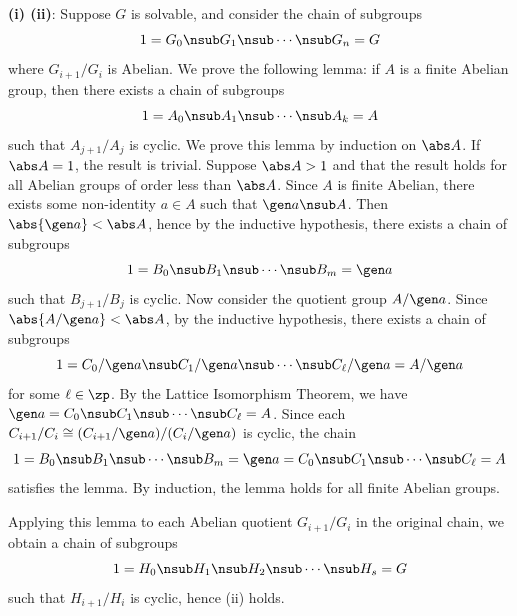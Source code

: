 \begin{sol}
    \textbf{(i) \rightimp (ii)}: Suppose $G$ is solvable, and consider the chain of subgroups
    \[
    	1 = G_0 \nsub G_1 \nsub \cdots \nsub G_n = G
    \]
    where $G_{i + 1}/G_i$ is Abelian.
	We prove the following lemma: if $A$ is a finite Abelian group, then there exists a chain of subgroups
    \[
    	1 = A_0 \nsub A_1 \nsub \cdots \nsub A_k = A
    \]
    such that $A_{j + 1}/A_j$ is cyclic.
	We prove this lemma by induction on $\abs A$.
	If $\abs A = 1$, the result is trivial.
	Suppose $\abs A > 1$ and that the result holds for all Abelian groups of order less than $\abs A$.
	Since $A$ is finite Abelian, there exists some non-identity $a \in A$ such that $\gen a \nsub A$.
	Then $\abs{\gen a} < \abs A$, hence by the inductive hypothesis, there exists a chain of subgroups
    \[
    	1 = B_0 \nsub B_1 \nsub \cdots \nsub B_m = \gen a
    \]
    such that $B_{j + 1}/B_j$ is cyclic.
	Now consider the quotient group $A/\gen a$.
	Since $\abs{A/\gen a} < \abs A$, by the inductive hypothesis, there exists a chain of subgroups
    \[
    	1 = C_0/\gen a \nsub C_1/\gen a \nsub \cdots \nsub C_\ell/\gen a = A/\gen a
    \]
    for some $\ell \in \zp$.
	By the Lattice Isomorphism Theorem, we have $\gen a = C_0 \nsub C_1 \nsub \cdots \nsub C_\ell = A$.
	Since each $C_{i + 1}/C_i \cong (C_{i + 1}/\gen a)/(C_i/\gen a)$ is cyclic, the chain
    \[
    	1 = B_0 \nsub B_1 \nsub \cdots \nsub B_m = \gen a = C_0 \nsub C_1 \nsub \cdots \nsub C_\ell = A
    \]
    satisfies the lemma.
	By induction, the lemma holds for all finite Abelian groups. 

    Applying this lemma to each Abelian quotient $G_{i + 1}/G_i$ in the original chain, we obtain a chain of subgroups
    \[
    	1 = H_0 \nsub H_1 \nsub H_2 \nsub \cdots \nsub H_s = G
    \]
    such that $H_{i + 1}/H_i$ is cyclic, hence (ii) holds.


\end{sol}
